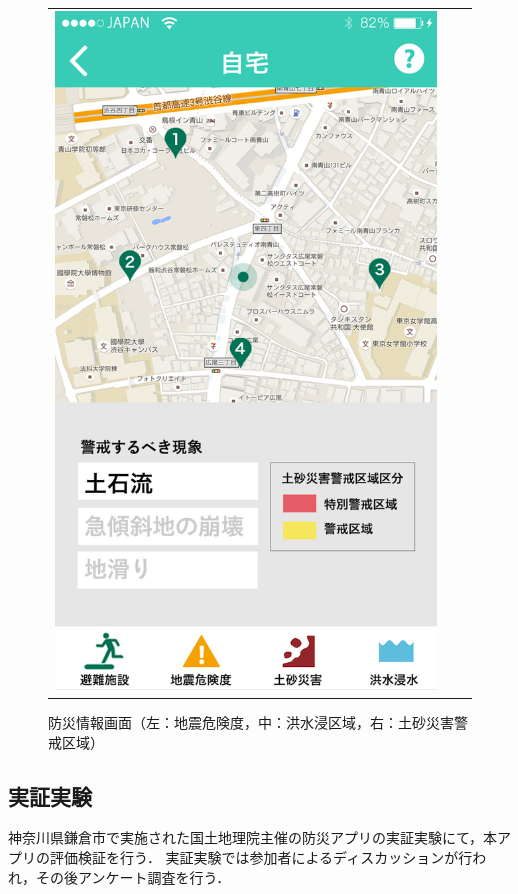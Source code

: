 \documentclass[a4paper]{jsarticle}
\begin{document}
\begin{figure}[H]
\begin{center}
\begin{tabular}{ccc}
\begin{minipage}{0.3\hsize}
      \includegraphics[width=\hsize]{./images/mbs_sediment.jpg}
    \end{minipage}

  \end{tabular}
    \caption{防災情報画面（左：地震危険度，中：洪水浸区域，右：土砂災害警戒区域）}
    \label{fig:screen-structure-02}
  \end{center}
\end{figure}
\fi


\subsection{実証実験}
神奈川県鎌倉市で実施された国土地理院主催の防災アプリの実証実験にて，本アプリの評価検証を行う．
実証実験では参加者によるディスカッションが行われ，その後アンケート調査を行う．
\end{document}
